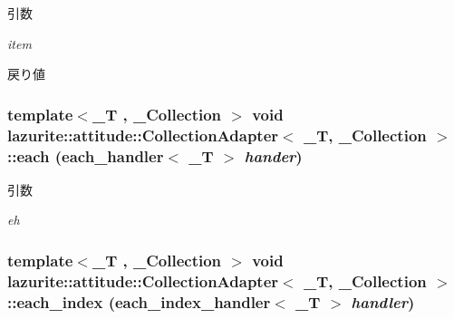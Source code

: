 \begin{DoxyParams}{引数}
\item[{\em item}]\end{DoxyParams}
\begin{DoxyReturn}{戻り値}

\end{DoxyReturn}
\hypertarget{classlazurite_1_1attitude_1_1_collection_adapter_3_01___t_00_01___collection_01_4_a25a44d143fd48762a8ebb7de08614b05}{
\subsubsection[{each}]{\setlength{\rightskip}{0pt plus 5cm}template$<$\_\-T , \_\-Collection $>$ void lazurite::attitude::CollectionAdapter$<$ \_\-T, \_\-Collection $>$::each (each\_\-handler$<$ \_\-T $>$ {\em hander})}}
\label{classlazurite_1_1attitude_1_1_collection_adapter_3_01___t_00_01___collection_01_4_a25a44d143fd48762a8ebb7de08614b05}

\begin{DoxyParams}{引数}
\item[{\em eh}]\end{DoxyParams}
\hypertarget{classlazurite_1_1attitude_1_1_collection_adapter_3_01___t_00_01___collection_01_4_a30edef4c0d9445b04b69a2308b88b1c5}{
\subsubsection[{each\_\-index}]{\setlength{\rightskip}{0pt plus 5cm}template$<$\_\-T , \_\-Collection $>$ void lazurite::attitude::CollectionAdapter$<$ \_\-T, \_\-Collection $>$::each\_\-index (each\_\-index\_\-handler$<$ \_\-T $>$ {\em handler})}}
\label{classlazurite_1_1attitude_1_1_collection_adapter_3_01___t_00_01___collection_01_4_a30edef4c0d9445b04b69a2308b88b1c5}

